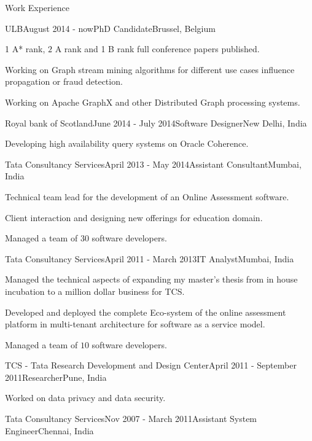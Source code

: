 \documentclass{resume} %
\begin{document}
\begin{rSection}{Work Experience}
\begin{rSubsection}{ULB}{August 2014 - now}{PhD Candidate}{Brussel, Belgium}
\item 1 A* rank, $2$ A rank and 1 B rank full conference papers published.
\item Working on Graph stream mining algorithms for different use cases influence propagation or fraud detection.
\item Working on Apache GraphX and other Distributed Graph processing systems.
\end{rSubsection}
\begin{rSubsection}{Royal bank of Scotland}{June 2014 - July 2014}{Software Designer}{New Delhi, India}
\item Developing high availability query systems on Oracle Coherence.
\end{rSubsection}
\begin{rSubsection}{Tata Consultancy Services}{April 2013 - May 2014}{Assistant Consultant}{Mumbai, India}
\item Technical team lead for the development of an Online Assessment software. 
\item Client interaction and designing new offerings for education domain.
\item Managed a team of $30$ software developers.  
\end{rSubsection}
\begin{rSubsection}{Tata Consultancy Services}{April 2011 - March 2013}{IT Analyst}{Mumbai, India}
\item Managed the technical aspects of expanding my master's thesis from in house incubation to a million dollar business for TCS.
\item Developed and deployed the complete Eco-system of the online assessment platform in multi-tenant architecture for software as a service model.
\item Managed a team of $10$ software developers.  
\end{rSubsection}
\begin{rSubsection}{TCS - Tata Research Development and Design Center}{April 2011 - September 2011}{Researcher}{Pune, India}
\item Worked on data privacy and data security.
\end{rSubsection}
\begin{rSubsection}{Tata Consultancy Services}{Nov 2007 - March 2011}{Assistant System Engineer}{Chennai, India}

\end{rSubsection}
\end{rSection}
\end{document}
